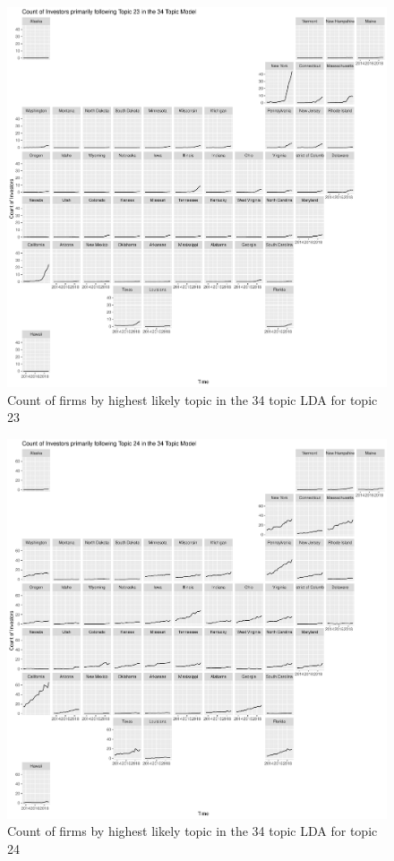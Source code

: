 \begin{figure}
	\centering
	\includegraphics[width=1\linewidth]{Figures/ChapterV/USA_34_Topic23.pdf}
	\caption[Count of Firms for Topic 23 by Quarter]{Count of firms by highest likely topic in the 34 topic LDA for topic 23}
	\label{fig:StateLDA23}
\end{figure}

\begin{figure}
	\centering
	\includegraphics[width=1\linewidth]{Figures/ChapterV/USA_34_Topic24.pdf}
	\caption[Count of Firms for Topic 24 by Quarter]{Count of firms by highest likely topic in the 34 topic LDA for topic 24}
	\label{fig:StateLDA24}
\end{figure}

